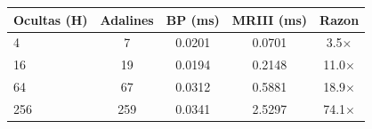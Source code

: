 \begin{tabular}{@{}lcccc@{}}
\toprule
Ocultas (H) & Adalines & BP (ms) & MRIII (ms) & Razon \\
\midrule
4 & 7 & 0.0201 & 0.0701 & 3.5$\times$ \\
16 & 19 & 0.0194 & 0.2148 & 11.0$\times$ \\
64 & 67 & 0.0312 & 0.5881 & 18.9$\times$ \\
256 & 259 & 0.0341 & 2.5297 & 74.1$\times$ \\
\bottomrule
\end{tabular}
